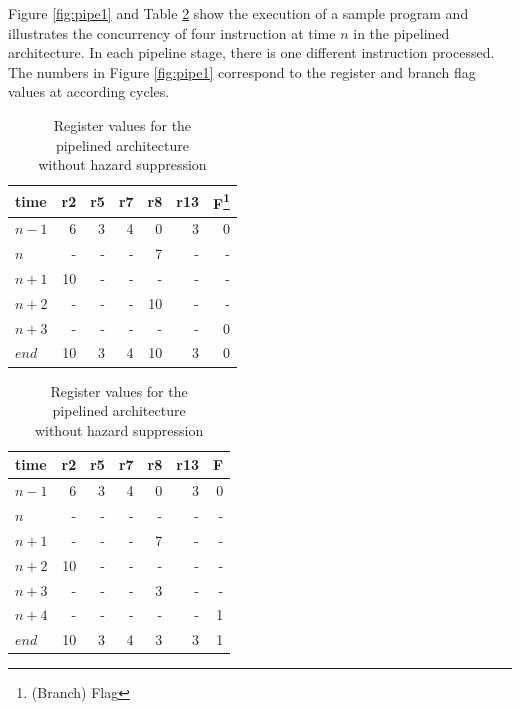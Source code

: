 Figure \ref{fig:pipe1} and Table \ref{tab:pipe1} show the execution of a sample program and illustrates the concurrency of four instruction at time $n$ in the pipelined architecture. In each pipeline stage, there is one different instruction processed. The numbers in Figure \ref{fig:pipe1} correspond to the register and branch flag values at according cycles.
\begin{table}[htbp]
			\centering

\begin{minipage}[t]{0.45\textwidth}

 \caption[Sample Execution of the one-cycle architecture]{Register values for the \\one-cycle architecture \\}
 \label{tab:pipe0}
\centering\begin{tabular}{|l|r|r|r|r|r||r|} \hline
time & r2 & r5 & r7 & r8 & r13 & F\footnote{(Branch) Flag} \\ \hline
$n-1$ & 6 & 3 & 4 & 0 & 3 & 0 \\ \hline
$n$ & - &-& - &7& - & - \\ \hline
$n+1$ & 10 &-& - & - & -& - \\ \hline
$n+2$ & - &-& - & 10 & - & - \\ \hline
$n+3$ & - &-& - & - & - & 0 \\ \hline \hline
$end$ & 10 & 3 & 4 & 10 &3 &0 \\ \hline


\end{tabular}
\end{minipage}
			\begin{minipage}[t]{0.45\textwidth}

 \caption[Sample Execution of the pipelined arch. w/o hazard suppression]{Register values for the \\pipelined architecture\\without hazard suppression}
 \label{tab:pipe1}
\centering\begin{tabular}{|l|r|r|r|r|r||r|} \hline
time & r2 & r5 & r7 & r8 & r13 & F \\ \hline
$n-1$ & 6 & 3 & 4 & 0 & 3 & 0 \\ \hline
$n$ & - &-& - &-& - & - \\ \hline
$n+1$ & - &-& - & 7 & - & - \\ \hline
$n+2$ & 10 &-& - &-& - & -\\ \hline
$n+3$ & - &-& -&3& - & -\\ \hline
$n+4$ & - &-& - &-& - & 1 \\ \hline \hline
$end$ & 10 & 3 & 4 & 3 &3&1 \\ \hline

\end{tabular}
\end{minipage}\hfill			

\end{table}

